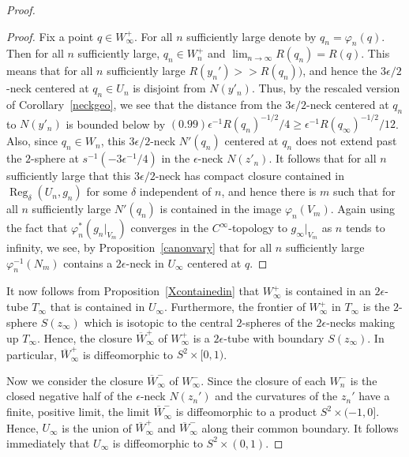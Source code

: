 \begin{proof}
\begin{proof}
Fix a point $q\in W^+_\infty$.
 For all $n$ sufficiently large denote by $q_n=\varphi_n(q)$.
 Then for all $n$ sufficiently large, $q_n\in W^+_n$ and
$\lim_{n\rightarrow\infty}R(q_n)=R(q)$. This means that for all
$n$ sufficiently large $R(y_n')>>R(q_n))$, and hence
 the $3\epsilon/2$-neck centered at
 $q_n\in U_n$ is disjoint from $N(y'_n)$. Thus, by the rescaled version of
 Corollary~\ref{neckgeo}, we see that  the distance from
 the $3\epsilon/2$-neck centered at $q_n$ to $N(y'_n)$ is bounded below by
 $(0.99)\epsilon^{-1}R(q_n)^{-1/2}/4\ge \epsilon^{-1}R(q_\infty)^{-1/2}/12$.
 Also, since $q_n\in W_n$, this $3\epsilon/2$-neck $N'(q_n)$ centered at
 $q_n$ does not extend past the $2$-sphere at $s^{-1}(-3\epsilon^{-1}/4)$ in the
 $ \epsilon$-neck $N(z'_n)$. It follows that for all $n$ sufficiently large that
 this $3\epsilon/2$-neck has
 compact closure contained in $\operatorname{Reg}_\delta(U_n,g_n)$ for some $\delta$
 independent of $n$, and hence there is $m$ such that for all $n$ sufficiently large $N'(q_n)$ is
 contained in the image $\varphi_n(V_m)$. Again using the fact that
 $\varphi_n^*(g_n|_{V_m})$ converges in the $C^\infty$-topology to
 $g_\infty|_{V_m}$ as $n$ tends to infinity, we see, by Proposition~\ref{canonvary}
 that for all $n$
 sufficiently large $\varphi_n^{-1}(N_m)$ contains a $2\epsilon$-neck in $U_\infty$ centered
 at $q$.
\end{proof}


It now follows from Proposition~\ref{Xcontainedin} that $W^+_\infty$
is contained in an $2\epsilon$-tube $T_\infty$ that is contained in
$U_\infty$. Furthermore, the frontier of $W^+_\infty$ in $T_\infty$
is the $2$-sphere $S(z_\infty)$ which is isotopic to the central
$2$-spheres of the $2\epsilon$-necks making up $T_\infty$. Hence,
the closure $\overline W^+_\infty$ of $W^+_\infty$ is a
$2\epsilon$-tube with boundary $S(z_\infty)$. In particular,
$\overline W^+_\infty$ is diffeomorphic to $S^2\times [0,1)$.

Now we consider the closure $\overline W^-_\infty$ of  $W^-_\infty$.
Since the closure of each $W^-_n$ is the closed negative half of the
$\epsilon$-neck $N(z_n')$ and the curvatures of the $z_n'$ have a
finite, positive limit, the limit $\overline W^-_\infty$ is
diffeomorphic to a product $S^2\times (-1,0]$. Hence, $U_\infty$ is
the union of  $\overline W^+_\infty$ and  $\overline W^-_\infty$
along their common boundary. It follows immediately that $U_\infty$
is diffeomorphic to $S^2\times (0,1)$.



\end{proof}
